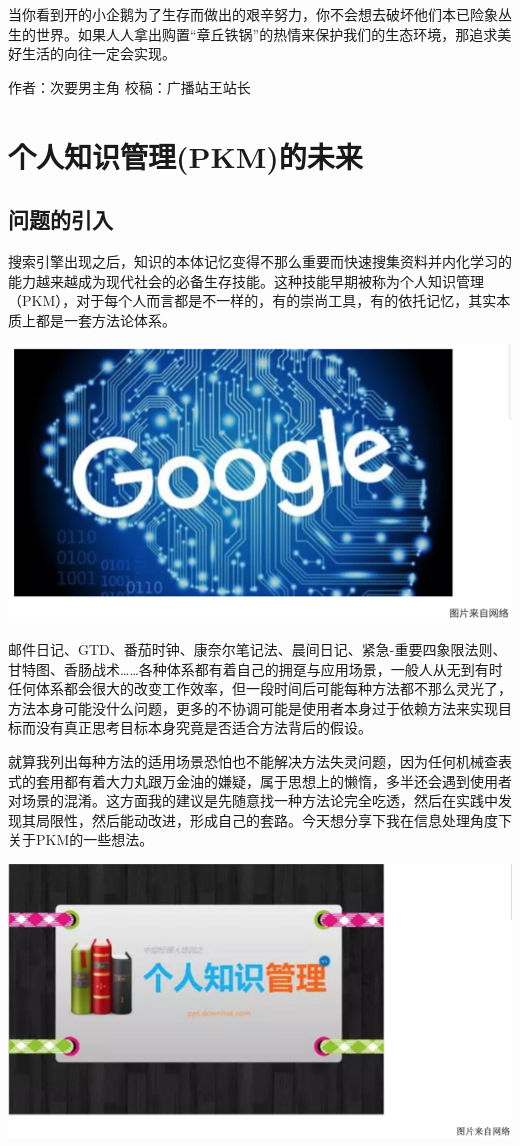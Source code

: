 \documentclass[]{book}
\begin{document}
当你看到开的小企鹅为了生存而做出的艰辛努力，你不会想去破坏他们本已险象丛生的世界。如果人人拿出购置``章丘铁锅''的热情来保护我们的生态环境，那追求美好生活的向往一定会实现。

作者：次要男主角 校稿：广播站王站长

\section{个人知识管理(PKM)的未来}\label{pkm}

\subsection{问题的引入}

搜索引擎出现之后，知识的本体记忆变得不那么重要而快速搜集资料并内化学习的能力越来越成为现代社会的必备生存技能。这种技能早期被称为个人知识管理（PKM），对于每个人而言都是不一样的，有的崇尚工具，有的依托记忆，其实本质上都是一套方法论体系。

\includegraphics[width=8.33in]{images/gtd1}

邮件日记、GTD、番茄时钟、康奈尔笔记法、晨间日记、紧急-重要四象限法则、甘特图、香肠战术\ldots{}\ldots{}各种体系都有着自己的拥趸与应用场景，一般人从无到有时任何体系都会很大的改变工作效率，但一段时间后可能每种方法都不那么灵光了，方法本身可能没什么问题，更多的不协调可能是使用者本身过于依赖方法来实现目标而没有真正思考目标本身究竟是否适合方法背后的假设。

就算我列出每种方法的适用场景恐怕也不能解决方法失灵问题，因为任何机械查表式的套用都有着大力丸跟万金油的嫌疑，属于思想上的懒惰，多半还会遇到使用者对场景的混淆。这方面我的建议是先随意找一种方法论完全吃透，然后在实践中发现其局限性，然后能动改进，形成自己的套路。今天想分享下我在信息处理角度下关于PKM的一些想法。

\includegraphics[width=8.33in]{images/gtd2}
\end{document}
